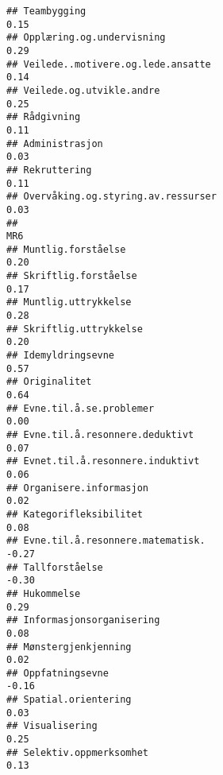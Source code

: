 \documentclass[
]{article}
\begin{document}
\begin{verbatim}
## Teambygging                                                                       0.15
## Opplæring.og.undervisning                                                         0.29
## Veilede..motivere.og.lede.ansatte                                                 0.14
## Veilede.og.utvikle.andre                                                          0.25
## Rådgivning                                                                        0.11
## Administrasjon                                                                    0.03
## Rekruttering                                                                      0.11
## Overvåking.og.styring.av.ressurser                                                0.03
##                                                                                    MR6
## Muntlig.forståelse                                                                0.20
## Skriftlig.forståelse                                                              0.17
## Muntlig.uttrykkelse                                                               0.28
## Skriftlig.uttrykkelse                                                             0.20
## Idemyldringsevne                                                                  0.57
## Originalitet                                                                      0.64
## Evne.til.å.se.problemer                                                           0.00
## Evne.til.å.resonnere.deduktivt                                                    0.07
## Evnet.til.å.resonnere.induktivt                                                   0.06
## Organisere.informasjon                                                            0.02
## Kategorifleksibilitet                                                             0.08
## Evne.til.å.resonnere.matematisk.                                                 -0.27
## Tallforståelse                                                                   -0.30
## Hukommelse                                                                        0.29
## Informasjonsorganisering                                                          0.08
## Mønstergjenkjenning                                                               0.02
## Oppfatningsevne                                                                  -0.16
## Spatial.orientering                                                               0.03
## Visualisering                                                                     0.25
## Selektiv.oppmerksomhet                                                            0.13

\end{verbatim}
\end{document}
